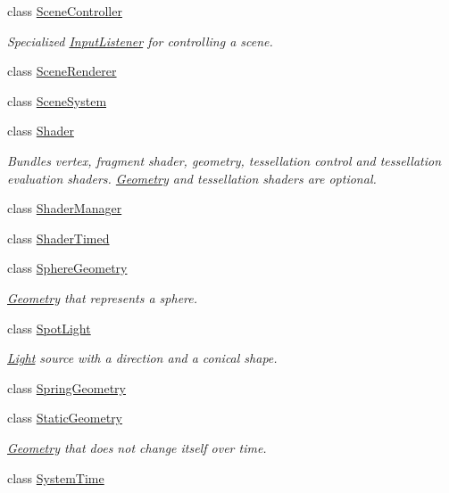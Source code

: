 \begin{DoxyCompactItemize}
class \mbox{\hyperlink{classec_1_1_scene_controller}{Scene\+Controller}}
\begin{DoxyCompactList}\small\item\em Specialized \mbox{\hyperlink{classec_1_1_input_listener}{Input\+Listener}} for controlling a scene. \end{DoxyCompactList}\item 
class \mbox{\hyperlink{classec_1_1_scene_renderer}{Scene\+Renderer}}
\item 
class \mbox{\hyperlink{classec_1_1_scene_system}{Scene\+System}}
\item 
class \mbox{\hyperlink{classec_1_1_shader}{Shader}}
\begin{DoxyCompactList}\small\item\em Bundles vertex, fragment shader, geometry, tessellation control and tessellation evaluation shaders. \mbox{\hyperlink{classec_1_1_geometry}{Geometry}} and tessellation shaders are optional. \end{DoxyCompactList}\item 
class \mbox{\hyperlink{classec_1_1_shader_manager}{Shader\+Manager}}
\item 
class \mbox{\hyperlink{classec_1_1_shader_timed}{Shader\+Timed}}
\item 
class \mbox{\hyperlink{classec_1_1_sphere_geometry}{Sphere\+Geometry}}
\begin{DoxyCompactList}\small\item\em \mbox{\hyperlink{classec_1_1_geometry}{Geometry}} that represents a sphere. \end{DoxyCompactList}\item 
class \mbox{\hyperlink{classec_1_1_spot_light}{Spot\+Light}}
\begin{DoxyCompactList}\small\item\em \mbox{\hyperlink{classec_1_1_light}{Light}} source with a direction and a conical shape. \end{DoxyCompactList}\item 
class \mbox{\hyperlink{classec_1_1_spring_geometry}{Spring\+Geometry}}
\item 
class \mbox{\hyperlink{classec_1_1_static_geometry}{Static\+Geometry}}
\begin{DoxyCompactList}\small\item\em \mbox{\hyperlink{classec_1_1_geometry}{Geometry}} that does not change itself over time. \end{DoxyCompactList}\item 
class \mbox{\hyperlink{classec_1_1_system_time}{System\+Time}}

\end{DoxyCompactItemize}

